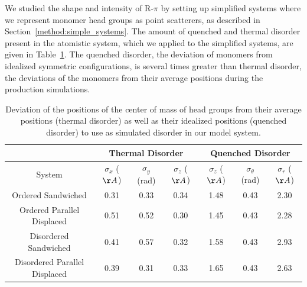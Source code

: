 \documentclass[journal=jpcbfk,manuscript=article]{achemso}
\begin{document}
  We studied the shape and intensity of R-$\pi$ by setting up simplified
  systems where we represent monomer head groups as point scatterers, as
  described in Section~\ref{method:simple_systems}. The amount of quenched and
  thermal disorder present in the atomistic system, which we applied to the
  simplified systems, are given in Table~\ref{table:quenched_disorder}. The
  quenched disorder, the deviation of monomers from idealized symmetric
  configurations, is several times greater than thermal disorder, the 
  deviations of the monomers from their average positions during the 
  production simulations.
  
  \begin{table}[h]
  \centering
  \begin{tabular}{c|ccc|ccc}
  \toprule
   		                        &           \multicolumn{3}{c}{Thermal Disorder}             &             \multicolumn{3}{c}{Quenched Disorder}               \\
  \midrule
  System                        & $\sigma_x$ ($\AA$) & $\sigma_y$ (rad) & $\sigma_z$ ($\AA$) & $\sigma_z$ ($\AA$) & $\sigma_\theta$ (rad) & $\sigma_r$ ($\AA$) \\
  \midrule
  Ordered Sandwiched            &         0.31       &       0.33       &        0.34        &        1.48        &     0.43              &     2.30           \\
  Ordered Parallel Displaced    &         0.51       &       0.52       &        0.30        &        1.45        &     0.43              &     2.28           \\ 
  Disordered Sandwiched         &         0.41       &       0.57       &        0.32        &        1.58        &     0.43              &     2.93           \\
  Disordered Parallel Displaced &         0.39       &       0.31       &        0.33        &        1.65        &     0.43              &     2.63           \\
  \bottomrule
  \end{tabular}
  \caption{Deviation of the positions of the center of mass of head groups from their average
  positions (thermal disorder) as well as their idealized positions (quenched disorder) to use 
  as simulated disorder in our model system.}
  \label{table:quenched_disorder} 
  \end{table}
  
\end{document}
